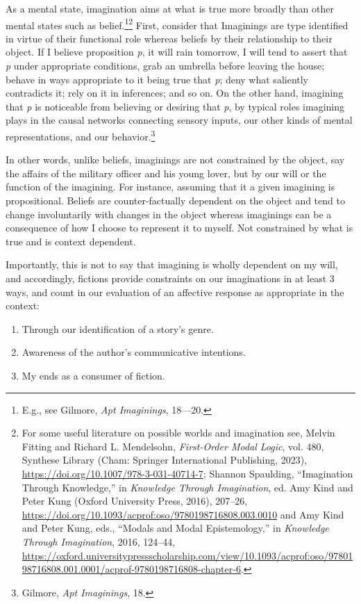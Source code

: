 \documentclass[phdthesis,12pt,final]{wuthesis}
\theoremstyle{definition}
\theoremstyle{definition}
\theoremstyle{definition}
\theoremstyle{definition}
\theoremstyle{remark}
\begin{document}
As a mental state, imagination aims at what is true more broadly than other mental states such as belief.\footnote{E.g., see Gilmore, \emph{Apt {Imaginings}}, 18---20.}\footnote{For some useful literature on possible worlds and imagination see, Melvin Fitting and Richard L. Mendelsohn, \emph{First-{Order Modal Logic}}, vol. 480, Synthese {Library} (Cham: Springer International Publishing, 2023), \url{https://doi.org/10.1007/978-3-031-40714-7}; Shannon Spaulding, {``Imagination {Through Knowledge},''} in \emph{Knowledge {Through Imagination}}, ed. Amy Kind and Peter Kung (Oxford University Press, 2016), 207--26, \url{https://doi.org/10.1093/acprof:oso/9780198716808.003.0010} and Amy Kind and Peter Kung, eds., {``Modals and {Modal Epistemology},''} in \emph{Knowledge {Through Imagination}}, 2016, 124--44, \url{https://oxford.universitypressscholarship.com/view/10.1093/acprof:oso/9780198716808.001.0001/acprof-9780198716808-chapter-6}.} First, consider that Imaginings are type identified in virtue of their functional role whereas beliefs by their relationship to their object. If I believe proposition \emph{p}, it will rain tomorrow, I will tend to assert that \emph{p} under appropriate conditions, grab an umbrella before leaving the house; behave in ways appropriate to it being true that \emph{p}; deny what saliently contradicts it; rely on it in inferences; and so on. On the other hand, imagining that \emph{p} is noticeable from believing or desiring that \emph{p}, by typical roles imagining plays in the causal networks connecting sensory inputs, our other kinds of mental representations, and our behavior.\footnote{Gilmore, \emph{Apt {Imaginings}}, 18.}

In other words, unlike beliefs, imaginings are not constrained by the object, say the affairs of the military officer and his young lover, but by our will or the function of the imagining. For instance, assuming that it a given imagining is propositional. Beliefs are counter-factually dependent on the object and tend to change involuntarily with changes in the object whereas imaginings can be a consequence of how I choose to represent it to myself. Not constrained by what is true and is context dependent.

Importantly, this is not to say that imagining is wholly dependent on my will, and accordingly, fictions provide constraints on our imaginations in at least 3 ways, and count in our evaluation of an affective response as appropriate in the context:

\begin{enumerate}
\def\labelenumi{\arabic{enumi}.}
\tightlist
\item
  Through our identification of a story's genre.
\item
  Awareness of the author's communicative intentions.
\item
  My ends as a consumer of fiction.
\end{enumerate}
\end{document}

